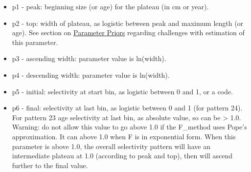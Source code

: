 	\begin{itemize}
		\item p1 - peak: beginning size (or age) for the plateau (in cm or year).
		\item p2 - top: width of plateau, as logistic between peak and maximum length (or age). See section on \hyperlink{PriorDescrip}{Parameter Priors} regarding challenges with estimation of this parameter.
		\item p3 - ascending width: parameter value is ln(width).
		\item p4 - descending width: parameter value is ln(width).
		\item p5 - initial: selectivity at start bin, as logistic between 0 and 1, or a code.
		\item p6 - final: selectivity at last bin, as logistic between 0 and 1 (for pattern 24). For pattern 23 age selectivity at last bin, as absolute value, so can be > 1.0. Warning: do not allow this value to go above 1.0 if the F\_method uses Pope's approximation. It can above 1.0 when F is in exponential form. When this parameter is above 1.0, the overall selectivity pattern will have an intermediate plateau at 1.0 (according to peak and top), then will ascend further to the final value.
	\end{itemize}
	
